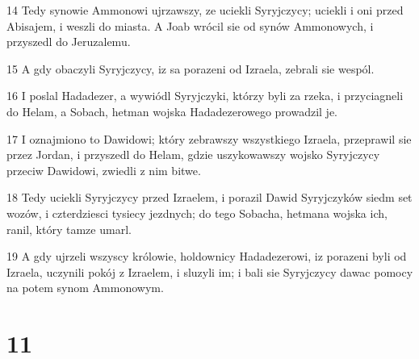 \par 14 Tedy synowie Ammonowi ujrzawszy, ze uciekli Syryjczycy; uciekli i oni przed Abisajem, i weszli do miasta. A Joab wrócil sie od synów Ammonowych, i przyszedl do Jeruzalemu.
\par 15 A gdy obaczyli Syryjczycy, iz sa porazeni od Izraela, zebrali sie wespól.
\par 16 I poslal Hadadezer, a wywiódl Syryjczyki, którzy byli za rzeka, i przyciagneli do Helam, a Sobach, hetman wojska Hadadezerowego prowadzil je.
\par 17 I oznajmiono to Dawidowi; który zebrawszy wszystkiego Izraela, przeprawil sie przez Jordan, i przyszedl do Helam, gdzie uszykowawszy wojsko Syryjczycy przeciw Dawidowi, zwiedli z nim bitwe.
\par 18 Tedy uciekli Syryjczycy przed Izraelem, i porazil Dawid Syryjczyków siedm set wozów, i czterdziesci tysiecy jezdnych; do tego Sobacha, hetmana wojska ich, ranil, który tamze umarl.
\par 19 A gdy ujrzeli wszyscy królowie, holdownicy Hadadezerowi, iz porazeni byli od Izraela, uczynili pokój z Izraelem, i sluzyli im; i bali sie Syryjczycy dawac pomocy na potem synom Ammonowym.

\chapter{11}

